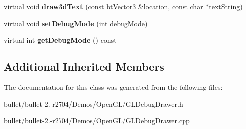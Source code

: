 \begin{DoxyCompactItemize}
\item 
\hypertarget{class_g_l_debug_drawer_a6325861596594c1f8df946cef3d14194}{virtual void {\bfseries draw3d\+Text} (const bt\+Vector3 \&location, const char $\ast$text\+String)}\label{class_g_l_debug_drawer_a6325861596594c1f8df946cef3d14194}

\item 
\hypertarget{class_g_l_debug_drawer_a91f3d38a8253603e41f8a9148f37dd9a}{virtual void {\bfseries set\+Debug\+Mode} (int debug\+Mode)}\label{class_g_l_debug_drawer_a91f3d38a8253603e41f8a9148f37dd9a}

\item 
\hypertarget{class_g_l_debug_drawer_a54af9866c8b723c08b961cf2e7905481}{virtual int {\bfseries get\+Debug\+Mode} () const }\label{class_g_l_debug_drawer_a54af9866c8b723c08b961cf2e7905481}

\end{DoxyCompactItemize}
\subsection*{Additional Inherited Members}


The documentation for this class was generated from the following files\+:\begin{DoxyCompactItemize}
\item 
bullet/bullet-\/2.-\/r2704/\+Demos/\+Open\+G\+L/G\+L\+Debug\+Drawer.\+h\item 
bullet/bullet-\/2.-\/r2704/\+Demos/\+Open\+G\+L/G\+L\+Debug\+Drawer.\+cpp\end{DoxyCompactItemize}
